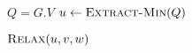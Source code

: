 
\begin{algorithm}[H]
  \begin{algorithmic}[1]
      \State {}

      \hStatex
      \State $Q = G.V$
	\State $u \gets \Call{Extract-Min}{Q}$

	\hStatex
	  \State $\Call{Relax}{u,v,w}$
	\EndFor
      \EndWhile
    \EndProcedure
  \end{algorithmic}
\end{algorithm}

